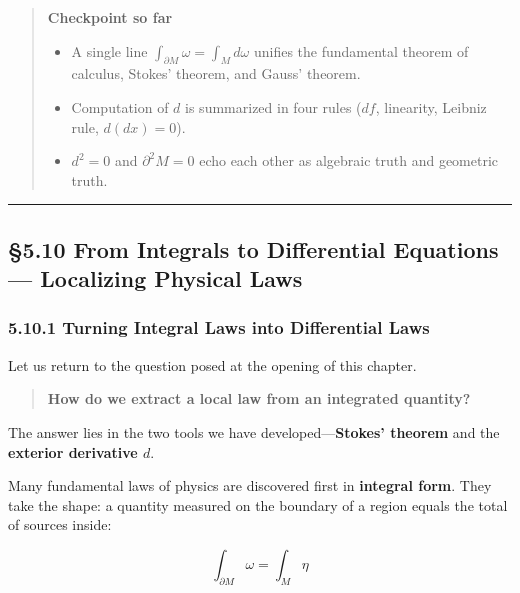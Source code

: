 \begin{quote}
\textbf{Checkpoint so far}

\begin{itemize}
\item
  A single line \(\int_{\partial M} \omega = \int_M d\omega\) unifies
  the fundamental theorem of calculus, Stokes' theorem, and Gauss'
  theorem.
\item
  Computation of \(d\) is summarized in four rules (\(df\), linearity,
  Leibniz rule, \(d(dx)=0\)).
\item
  \(d^2=0\) and \(\partial^2 M=0\) echo each other as algebraic truth
  and geometric truth.
\end{itemize}
\end{quote}

\begin{center}\rule{0.5\linewidth}{0.5pt}\end{center}

\hypertarget{from-integrals-to-differential-equations-localizing-physical-laws}{%
\subsection{§5.10 From Integrals to Differential Equations ---
Localizing Physical
Laws}\label{from-integrals-to-differential-equations-localizing-physical-laws}}

\hypertarget{turning-integral-laws-into-differential-laws}{%
\subsubsection{5.10.1 Turning Integral Laws into Differential
Laws}\label{turning-integral-laws-into-differential-laws}}

Let us return to the question posed at the opening of this chapter.

\begin{quote}
\textbf{How do we extract a local law from an integrated quantity?}
\end{quote}

The answer lies in the two tools we have
developed---\textbf{Stokes' theorem} and the
\textbf{exterior derivative $d$}.

Many fundamental laws of physics are discovered first in
\textbf{integral form}. They take the shape: a quantity measured on the
boundary of a region equals the total of sources inside:

\[\int_{\partial M} \omega = \int_M \eta\]

